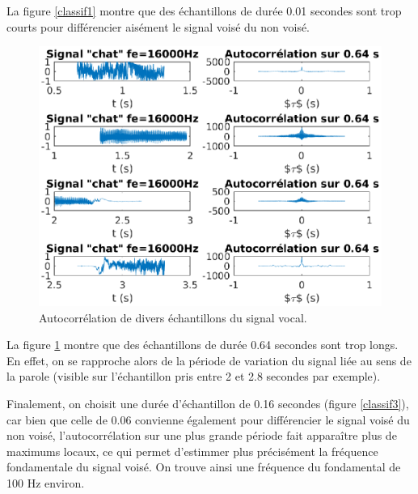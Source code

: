 \documentclass[french]{article}
\begin{document}
La figure \ref{classif1} montre que des échantillons de durée 0.01 secondes sont trop courts pour différencier aisément le signal voisé du non voisé.

\begin{figure}[h!]
\centering
\includegraphics[height=0.45\textheight]{images/classificationVoix4.eps}
\caption{Autocorrélation de divers échantillons du signal vocal.}
\label{classif4}
\end{figure}

La figure \ref{classif4} montre que des échantillons de durée 0.64 secondes sont trop longs. En effet, on se rapproche alors de la période de variation du signal liée au sens de la parole (visible sur l'échantillon pris entre 2 et 2.8 secondes par exemple).


Finalement,  on choisit une durée d'échantillon de 0.16 secondes (figure \ref{classif3}), car bien que celle de 0.06 convienne également pour différencier le signal voisé du non voisé, l'autocorrélation sur une plus grande période fait apparaître plus de maximums locaux, ce qui permet d'estimmer plus précisément la fréquence fondamentale du signal voisé. On trouve ainsi une fréquence du fondamental de 100 Hz environ.
\end{document}
